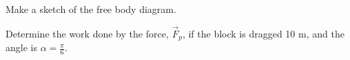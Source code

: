 \begin{problem}
  \begin{subproblem}
    \item Make a sketch of the free body diagram.
      \vspace{6em}
    \item Determine the work done by the force, $\vec{F}_p$, if the
      block is dragged 10 m, and the angle is $\alpha=\frac{\pi}{6}$.

      \vfill

%
      \vfill

%

  \end{subproblem}


\end{problem}


